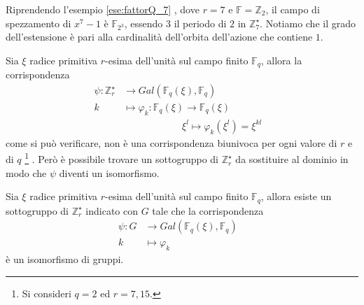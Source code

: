 \begin{esempio}
   Riprendendo l'esempio \ref{ese:fattorQ_7} , dove $r=7$ e $\mathbb{F} = \mathbb{Z}_{2}$, il campo di spezzamento di $x^7 -1$ è $\mathbb{F}_{2^3}$, essendo $3$ il periodo di $2$ in $\mathbb{Z}_{7}^{\star}$. Notiamo che il grado dell'estensione è pari alla cardinalità dell'orbita dell'azione che contiene $1$.
\end{esempio}

Sia $\xi$ radice primitiva $r$-esima dell'unità sul campo finito $\mathbb{F}_{q}$, allora la corrispondenza
\begin{align*}
\psi: \mathbb{Z}_{r}^{\star} & \longrightarrow  Gal(\mathbb{F}_{q}(\xi), \mathbb{F}_{q}) &   \\
                         k &\longmapsto  \varphi_{k} : \mathbb{F}_{q}(\xi)\longrightarrow  \mathbb{F}_{q}(\xi)\\
                                    & \quad \qquad \qquad \quad \xi^{l} \longmapsto \varphi_{k}(\xi^{l}) = \xi^{kl}
\end{align*}
come si può verificare, non è una corrispondenza biunivoca per ogni valore di $r$ e di $q$
\footnote{Si consideri $q=2$ ed $r= 7,15$.}
. Però è possibile trovare un sottogruppo di $\mathbb{Z}_{r}^{\star}$ da sostituire al dominio in modo che $\psi$ diventi un isomorfismo.
\begin{teorema} \label{teo:HsuGF}
Sia $\xi$ radice primitiva $r$-esima dell'unità sul campo finito $\mathbb{F}_{q}$, allora esiste un sottogruppo di $\mathbb{Z}_{r}^{\star}$ indicato con $G$ tale che la corrispondenza
\begin{align*}
\psi: G & \longrightarrow  Gal(\mathbb{F}_{q}(\xi), \mathbb{F}_{q}) &   \\
      k &\longmapsto \varphi_{k}
\end{align*}
è un isomorfismo di gruppi.
\end{teorema}
